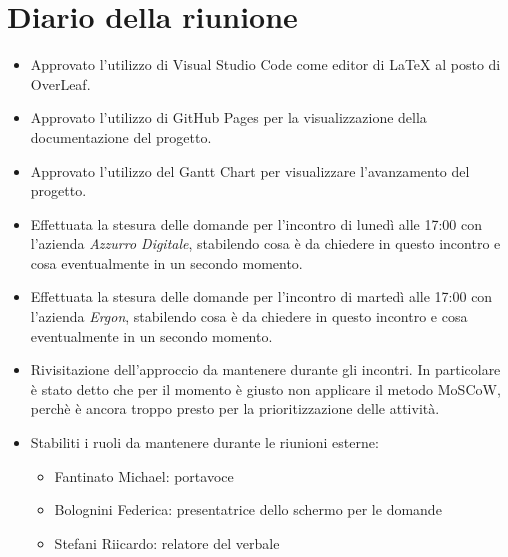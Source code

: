 \section{Diario della riunione}

\begin{itemize}
    \item Approvato l'utilizzo di Visual Studio Code come editor di LaTeX al posto di OverLeaf.
    
    \item Approvato l'utilizzo di GitHub Pages per la visualizzazione della documentazione del progetto.
    
    \item Approvato l'utilizzo del Gantt Chart per visualizzare l'avanzamento del progetto.

    \item Effettuata la stesura delle domande per l'incontro di lunedì alle 17:00 con l'azienda \emph{Azzurro Digitale}, stabilendo cosa è da chiedere in questo incontro e cosa eventualmente in un secondo momento.
    
    \item Effettuata la stesura delle domande per l'incontro di martedì alle 17:00 con l'azienda \emph{Ergon}, stabilendo cosa è da chiedere in questo incontro e cosa eventualmente in un secondo momento.

    \item Rivisitazione dell'approccio da mantenere durante gli incontri. In particolare è stato detto che per il momento è giusto non applicare il metodo MoSCoW, perchè è ancora troppo presto per la prioritizzazione delle attività.

    \item Stabiliti i ruoli da mantenere durante le riunioni esterne:
    \begin{itemize}
        \renewcommand{\labelitemii}{--}
        \item Fantinato Michael: portavoce
        \item Bolognini Federica: presentatrice dello schermo per le domande
        \item Stefani Riicardo: relatore del verbale
    \end{itemize}
\end{itemize}